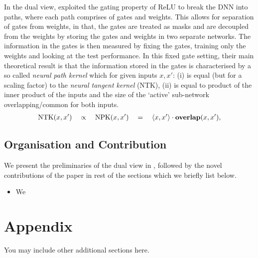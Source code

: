 \documentclass{article} %
\begin{document}
In the dual view, \cite{npk} exploited the gating property of ReLU to break the DNN into paths, where each path comprises of gates and weights. This allows for separation of gates from weights, in that, the gates are treated as masks and are decoupled from the weights by storing the gates and weights in two separate networks. The information in the gates is then measured by fixing the gates, training only the weights and looking at the test performance. In this fixed gate setting, their main theoretical result is that the information stored in the gates is characterised by a so called \emph{neural path kernel} which for given inputs $x,x'$: (i) is equal (but for a scaling factor) to the \emph{neural tangent kernel} (NTK), (ii) is equal to product of the inner product of the inputs and the size of the `active' sub-network overlapping/common for both inputs.
\begin{align}\label{eq:ntk-npk-relation}
\text{NTK}(x,x')\quad\propto\quad \text{NPK}(x,x')\quad =\quad \langle x,x'\rangle\cdot {\bf{overlap}}(x,x'),
\end{align}

%

\subsection{Organisation and Contribution}
We present the preliminaries of the dual view in , followed by the novel contributions of the paper in rest of the sections which we briefly list below.

\begin{itemize}
\item {} We 
\end{itemize}








\appendix
\section{Appendix}
You may include other additional sections here.
\end{document}

